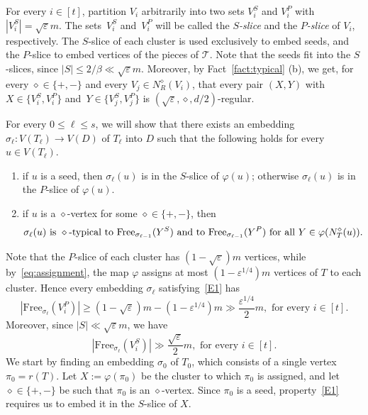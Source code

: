\documentclass[11pt]{article}
\numberwithin{equation}{section}
\renewcommand{\geq}{\geqslant}
\renewcommand{\leq}{\leqslant}
\newcommand{\defi}[1]{\emph{\color{red!50!black}#1}}
\def\Free{\mathrm{Free}}
\let\eps=\varepsilon
\let\phi=\varphi
\newcommand{\cT}{\mathcal{T}}
\theoremstyle{definition}
\def\eps{{\varepsilon}}
\begin{document}
For every $i \in [t]$, partition $V_i$ arbitrarily into two sets $V^{S}_i$ and $V^{P}_i$
with $|V_i^S| = \sqrt{\eps}m$. The sets~$V_i^{S}$ and~$V_i^{P}$ will be called the \defi{$S$-slice} and
the \defi{$P$-slice} of $V_i$, respectively. The $S$-slice of each cluster is used exclusively
to embed seeds, and the $P$-slice to embed vertices of the pieces of $\cT$. Note that the seeds
fit into the $S$-slices, since $|S| \leq 2/\beta \ll \sqrt{\eps}m$.
Moreover, by Fact~\ref{fact:typical} (b), we get, for every $\diamond \in \{+,-\}$ and 
every $V_j \in N^{\diamond}_R(V_i)$, that every pair $(X,Y)$ with $X \in \{V_i^{S},V_i^{P}\}$
and~$Y \in \{V_j^{S}, V_j^{P}\}$ is $(\sqrt{\eps}, \diamond,d/2)$-regular.

For every $0 \leq \ell \leq s$, we will show that there exists an embedding $\sigma_\ell: V(T_\ell) \rightarrow V(D)$ of
$T_\ell$ into $D$ such that the following holds for every $u \in V(T_\ell)$.
\begin{enumerate}[label = \textbf{(E\arabic*)}]
    \item if $u$ is a seed, then $\sigma_{\ell}(u)$ is in the $S$-slice of $\varphi(u)$; otherwise $\sigma_{\ell}(u)$ is in the $P$-slice of $\varphi(u)$. \label{E1}
    \item if $u$ is a $\diamond$-vertex for some $\diamond\in \{+,-\}$, then 
    \[
     \sigma_\ell(u) \textnormal{ is } \diamond\textnormal{-typical to } \Free_{\sigma_{\ell-1}}(Y^{S})  \textnormal{ and to } \Free_{\sigma_{\ell-1}}(Y^{P})\textnormal{ for all } Y\in \phi(N^{\diamond}_T(u)).
     \]\label{E2}
\end{enumerate}


Note that the $P$-slice of each cluster has $(1-\sqrt{\eps})m$ vertices, while by~\eqref{eq:assignment},
the map $\varphi$ assigns at most $(1-\eps^{1/4})m$ vertices of $T$ to each cluster. Hence
every embedding $\sigma_\ell$ satisfying~\ref{E1} has
\begin{equation}
    \label{eq:free}
    |\Free_{\sigma_{\ell}}(V_i^{P})| \geq \left(1-\sqrt{\eps}\right)m - (1-\eps^{1/4})m \gg \frac{\eps^{1/4}}{2}m, \text{ for every } i \in [t].
\end{equation}
Moreover, since $|S| \ll \sqrt{\eps}m$, we have
\begin{equation}
    |\Free_{\sigma_{\ell}}(V_i^{S})| \gg \frac{\sqrt{\eps}}{2}m, \text{ for every } i \in [t].
\end{equation}
We start by finding an embedding $\sigma_0$ of $T_0$, which consists of a single vertex $\pi_0 = r(T)$.
Let $X := \varphi(\pi_0)$ be the cluster to which $\pi_0$ is assigned,
and let $\diamond \in \{+,-\}$ be such that $\pi_0$ is an $\diamond$-vertex. Since $\pi_0$ is a seed,
property~\ref{E1} requires us to embed it in the $S$-slice of $X$.
\end{document}
